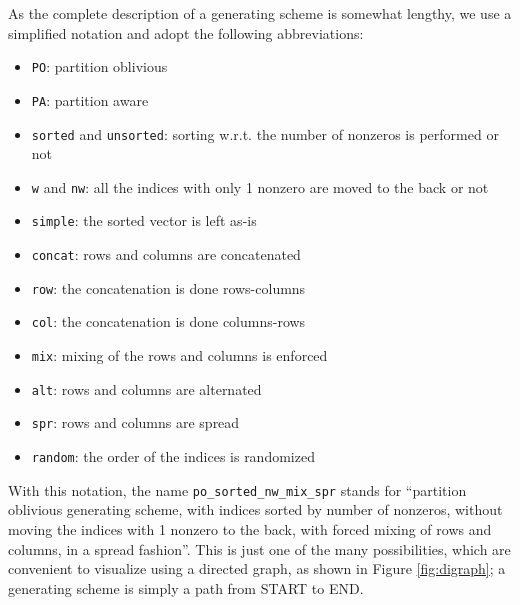 As the complete description of a generating scheme is somewhat lengthy, we use a simplified notation and adopt the following abbreviations:

\begin{itemize}
	\item \verb|PO|: partition oblivious
	\item \verb|PA|: partition aware
	\item \verb|sorted| and \verb|unsorted|: sorting w.r.t. the number of nonzeros is performed or not
	\item \verb|w| and \verb|nw|: all the indices with only 1 nonzero are moved to the back or not
	\item \verb|simple|: the sorted vector is left as-is
	\item \verb|concat|: rows and columns are concatenated
	\item \verb|row|: the concatenation is done rows-columns
	\item \verb|col|: the concatenation is done columns-rows
	\item \verb|mix|: mixing of the rows and columns is enforced
	\item \verb|alt|: rows and columns are alternated
	\item \verb|spr|: rows and columns are spread
	\item \verb|random|: the order of the indices is randomized
\end{itemize}

With this notation, the name \verb|po_sorted_nw_mix_spr| stands for ``partition oblivious generating scheme, with indices sorted by number of nonzeros, without moving the indices with 1 nonzero to the back, with forced mixing of rows and columns, in a spread fashion''. This is just one of the many possibilities, which are convenient to visualize using a directed graph, as shown in Figure \ref{fig:digraph}; a generating scheme is simply a path from START to END. 

